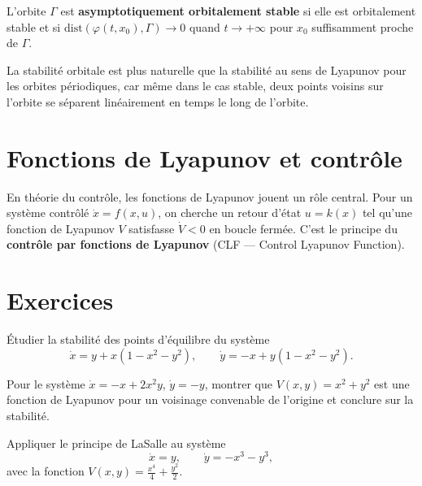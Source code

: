 \begin{definition}
L'orbite $\Gamma$ est \textbf{asymptotiquement orbitalement stable} si elle
est orbitalement stable et si
$\mathrm{dist}(\varphi(t, x_0), \Gamma) \to 0$ quand $t \to +\infty$
pour $x_0$ suffisamment proche de $\Gamma$.
\end{definition}

\begin{remarque}
La stabilit\'e orbitale est plus naturelle que la stabilit\'e au sens de Lyapunov
pour les orbites p\'eriodiques, car m\^eme dans le cas stable, deux points
voisins sur l'orbite se s\'eparent lin\'eairement en temps le long de l'orbite.
\end{remarque}

\section{Fonctions de Lyapunov et contr\^ole}

\begin{remarque}
En th\'eorie du contr\^ole, les fonctions de Lyapunov jouent un r\^ole central.
Pour un syst\`eme contr\^ol\'e $\dot{x} = f(x, u)$, on cherche un retour
d'\'etat $u = k(x)$ tel qu'une fonction de Lyapunov $V$ satisfasse
$\dot{V} < 0$ en boucle ferm\'ee. C'est le principe du
\textbf{contr\^ole par fonctions de Lyapunov} (CLF --- Control Lyapunov Function).
\end{remarque}

\section{Exercices}

\begin{exercice}
\'Etudier la stabilit\'e des points d'\'equilibre du syst\`eme
\[
    \dot{x} = y + x(1 - x^2 - y^2), \qquad \dot{y} = -x + y(1 - x^2 - y^2).
\]
\end{exercice}

\begin{exercice}
Pour le syst\`eme $\dot{x} = -x + 2x^2y$, $\dot{y} = -y$, montrer que
$V(x,y) = x^2 + y^2$ est une fonction de Lyapunov pour un voisinage
convenable de l'origine et conclure sur la stabilit\'e.
\end{exercice}

\begin{exercice}[LaSalle]
Appliquer le principe de LaSalle au syst\`eme
\[
    \dot{x} = y, \qquad \dot{y} = -x^3 - y^3,
\]
avec la fonction $V(x,y) = \frac{x^4}{4} + \frac{y^2}{2}$.
\end{exercice}

